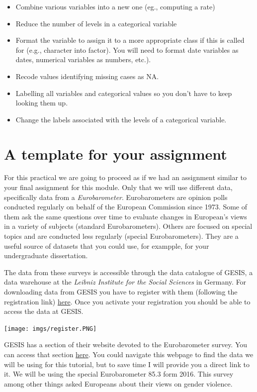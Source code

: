 \documentclass[
]{book}
\providecommand{\tightlist}{%
  \setlength{\itemsep}{0pt}\setlength{\parskip}{0pt}}
\begin{document}
\begin{itemize}
\tightlist
\item
  Combine various variables into a new one (eg., computing a rate)
\item
  Reduce the number of levels in a categorical variable
\item
  Format the variable to assign it to a more appropriate class if this is called for (e.g., character into factor). You will need to format date variables as dates, numerical variables as numbers, etc.).
\item
  Recode values identifying missing cases as NA.
\item
  Labelling all variables and categorical values so you don't have to keep looking them up.
\item
  Change the labels associated with the levels of a categorical variable.
\end{itemize}

\hypertarget{a-template-for-your-assignment}{%
\section{A template for your assignment}\label{a-template-for-your-assignment}}

For this practical we are going to proceed as if we had an assignment similar to your final assignment for this module. Only that we will use different data, specifically data from a \emph{Eurobarometer}. Eurobarometers are opinion polls conducted regularly on behalf of the European Commission since 1973. Some of them ask the same questions over time to evaluate changes in European's views in a variety of subjects (standard Eurobarometers). Others are focused on special topics and are conducted less regularly (special Eurobarometers). They are a useful source of datasets that you could use, for exampple, for your undergraduate dissertation.

The data from these surveys is accessible through the data catalogue of GESIS, a data warehouse at the \emph{Leibniz Institute for the Social Sciences} in Germany. For downloading data from GESIS you have to register with them (following the registration link) \href{https://dbk.gesis.org/dbksearch/register.asp}{here}. Once you activate your registration you should be able to access the data at GESIS.

\texttt{[image: imgs/register.PNG]}

GESIS has a section of their website devoted to the Eurobarometer survey. You can access that section \href{https://www.gesis.org/eurobarometer-data-service/home/}{here}. You could navigate this webpage to find the data we will be using for this tutorial, but to save time I will provide you a direct link to it. We will be using the special Eurobarometer 85.3 form 2016. This survey among other things asked Europeans about their views on gender violence.
\end{document}
